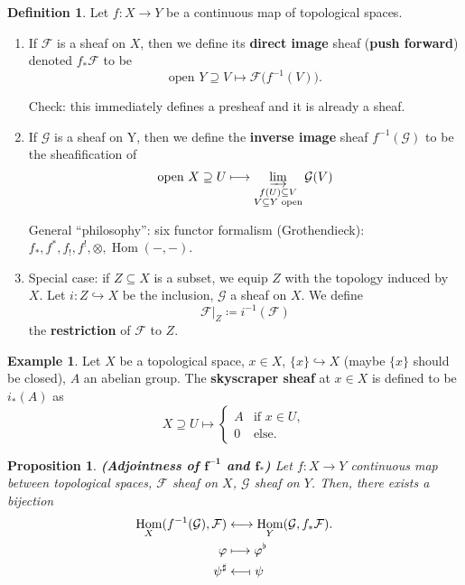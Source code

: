 \documentclass[12pt]{article}
\DeclareMathOperator{\Hom}{Hom}
\newtheorem*{proposition}{Proposition}
\theoremstyle{definition}
\newtheorem*{definition}{Definition}
\newtheorem*{example}{Example}
\begin{document}
\begin{definition}
Let $f:X\rightarrow Y$ be a continuous map of topological spaces.

\begin{enumerate}[label=\arabic*)]
\item If $\mathcal F$ is a sheaf on $X$, then we define its \textbf{direct image} sheaf (\textbf{push forward}) denoted $f_*\mathcal F$ to be
\[\text{open }Y\supseteq V\longmapsto\mathcal F\big(f^{-1}(V)\big).\]

Check: this immediately defines a presheaf and it is already a sheaf.

\item If $\mathcal G$ is a sheaf on Y, then we define the \textbf{inverse image} sheaf $f^{-1}(\mathcal G)$ to be the sheafification of
\[\text{open }X\supseteq U\longmapsto\varinjlim_{\substack{f(U)\subseteq V\\V\subseteq Y\text{ open}}}\mathcal G(V)\]

General ``philosophy'': six functor formalism (Grothendieck): $f_*,f^*,f_!,f^!,\otimes,\Hom(-,-)$.

\item Special case: if $Z\subseteq X$ is a subset, we equip $Z$ with the topology induced by $X$. Let $i:Z\hookrightarrow X$ be the inclusion, $\mathcal G$ a sheaf on $X$. We define
\[\mathcal F|_Z\coloneqq i^{-1}(\mathcal F)\]
the \textbf{restriction} of $\mathcal F$ to $Z$.
\end{enumerate}
\end{definition}

\begin{example}
Let $X$ be a topological space, $x\in X$, $\{x\}\hookrightarrow X$ (maybe $\{x\}$ should be closed), $A$ an abelian group. The \textbf{skyscraper sheaf} at $x\in X$ is defined to be $i_*(A)$ as
\[X\supseteq U\longmapsto\left\{\begin{array}{ll}A&\text{if }x\in U,\\0&\text{else}.\end{array}\right.\]
\end{example}

\begin{proposition}
\emph{\textbf{(Adjointness of $\boldsymbol{f^{-1}}$ and $\boldsymbol{f_*}$)}} Let $f:X\rightarrow Y$ continuous map between topological spaces, $\mathcal F$ sheaf on $X$, $\mathcal G$ sheaf on $Y$. Then, there exists a bijection
\begin{align*}
\Hom_X(f^{-1}(\mathcal G),\mathcal F)&\longleftrightarrow\Hom_Y(\mathcal G,f_*\mathcal F).\\\varphi&\longmapsto\varphi^\flat\\\psi^\sharp&\longleftarrow\!\shortmid\psi
\end{align*}
\end{proposition}
\end{document}
